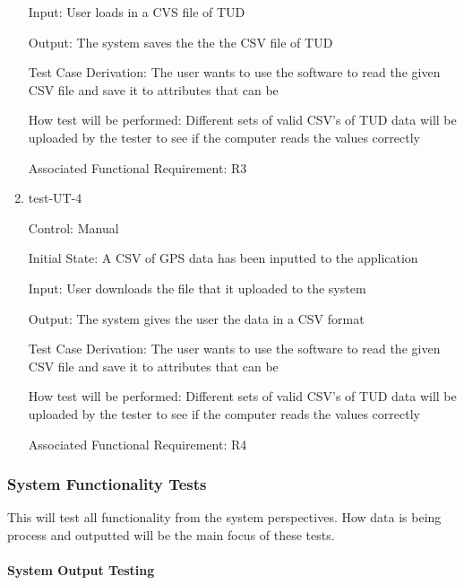 \documentclass[12pt, titlepage]{article}
\begin{document}
\begin{enumerate}
Input: User loads in a CVS file of TUD
					
Output: The system saves the the the CSV file of TUD

Test Case Derivation: The user wants to use the software to read the given CSV file and save it to attributes that can be 
					
How test will be performed: Different sets of valid CSV's of TUD data will be uploaded by the tester to see if the computer reads the values correctly

Associated Functional Requirement: R3

\item{test-UT-4\\}

Control: Manual 
					
Initial State: A CSV of GPS data has been inputted to the application
					
Input: User downloads the file that it uploaded to the system 
					
Output: The system gives the user the data in a CSV format 

Test Case Derivation: The user wants to use the software to read the given CSV file and save it to attributes that can be 
					
How test will be performed: Different sets of valid CSV's of TUD data will be uploaded by the tester to see if the computer reads the values correctly

Associated Functional Requirement: R4
\end{enumerate}

\subsubsection{System Functionality Tests}

This will test all functionality from the system perspectives. How data is being process and outputted will be the main focus of these tests. 
		
\paragraph{System Output Testing}
\end{document}
